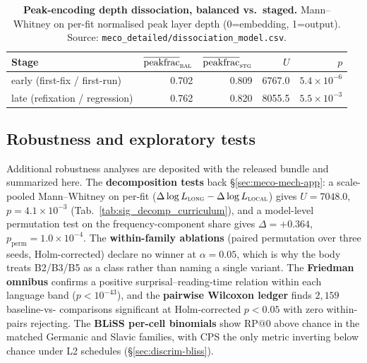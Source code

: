 \begin{table}[!ht]
  \centering
  \small
  \caption{\textbf{Peak-encoding depth dissociation, balanced vs.\ staged.} Mann--Whitney on per-fit normalised peak layer depth (0=embedding, 1=output). Source: \texttt{meco\_detailed/dissociation\_model.csv}.}
  \label{tab:sig_decomp_dissociation}
  \begin{tabular}{lrrrr}
    \toprule
    Stage & $\overline{\text{peakfrac}}_\textsc{bal}$ & $\overline{\text{peakfrac}}_\textsc{stg}$ & $U$ & $p$ \\
    \midrule
    early (first-fix / first-run) & 0.702 & 0.809 & 6767.0 & $5.4{\times}10^{-6}$ \\
    late (refixation / regression) & 0.762 & 0.820 & 8055.5 & $5.5{\times}10^{-3}$ \\
    \bottomrule
  \end{tabular}
\end{table}

\subsection{Robustness and exploratory tests}\label{sec:sig-robustness}

Additional robustness analyses are deposited with the released bundle and summarized here. The \textbf{decomposition tests} back \S\ref{sec:meco-mech-app}: a scale-pooled Mann--Whitney on per-fit ($\Delta\log L_\textsc{long}-\Delta\log L_\textsc{local}$) gives $U=7048.0$, $p=4.1{\times}10^{-3}$ (Tab.~\ref{tab:sig_decomp_curriculum}), and a model-level permutation test on the frequency-component share gives $\Delta=+0.364$, $p_\text{perm}=1.0{\times}10^{-4}$. The \textbf{within-family ablations} (paired permutation over three seeds, Holm-corrected) declare no winner at $\alpha=0.05$, which is why the body treats B2/B3/B5 as a class rather than naming a single variant. The \textbf{Friedman omnibus} confirms a positive surprisal--reading-time relation within each language band ($p<10^{-43}$), and the \textbf{pairwise Wilcoxon ledger} finds $2{,}159$ baseline-vs-\beetle{} comparisons significant at Holm-corrected $p<0.05$ with zero within-\beetle{} pairs rejecting. The \textbf{BLiSS per-cell binomials} show RP$@0$ above chance in the matched Germanic and Slavic families, with CPS the only metric inverting below chance under L2 schedules (\S\ref{sec:discrim-bliss}).


